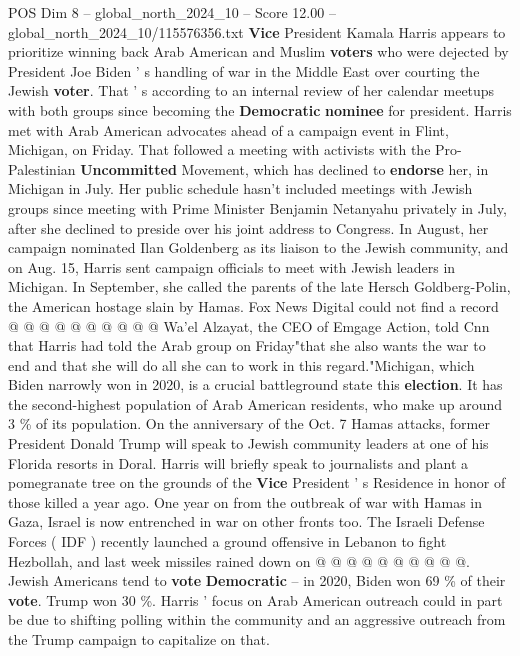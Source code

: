 \begin{textsample}{POS Dim 8 – global\_north\_2024\_10 – Score 12.00 – global\_north\_2024\_10/115576356.txt}  \label{ex:f8_pos_162}
\textbf{Vice} President Kamala Harris appears to prioritize winning back Arab American and Muslim \textbf{voters} who were dejected by President Joe Biden ' s handling of war in the Middle East over courting the Jewish \textbf{voter}.
That ' s according to an internal review of her calendar meetups with both groups since becoming the \textbf{Democratic} \textbf{nominee} for president.
Harris met with Arab American advocates ahead of a campaign event in Flint, Michigan, on Friday.
That followed a meeting with activists with the Pro-Palestinian \textbf{Uncommitted} Movement, which has declined to \textbf{endorse} her, in Michigan in July.
Her public schedule hasn't included meetings with Jewish groups since meeting with Prime Minister Benjamin Netanyahu privately in July, after she declined to preside over his joint address to Congress.
In August, her campaign nominated Ilan Goldenberg as its liaison to the Jewish community, and on Aug. 15, Harris sent campaign officials to meet with Jewish leaders in Michigan.
In September, she called the parents of the late Hersch Goldberg-Polin, the American hostage slain by Hamas.
Fox News Digital could not find a record @ @ @ @ @ @ @ @ @ @ Wa'el Alzayat, the CEO of Emgage Action, told Cnn that Harris had told the Arab group on Friday"that she also wants the war to end and that she will do all she can to work in this regard."Michigan, which Biden narrowly won in 2020, is a crucial battleground state this \textbf{election}.
It has the second-highest population of Arab American residents, who make up around 3 \% of its population.
On the anniversary of the Oct. 7 Hamas attacks, former President Donald Trump will speak to Jewish community leaders at one of his Florida resorts in Doral.
Harris will briefly speak to journalists and plant a pomegranate tree on the grounds of the \textbf{Vice} President ' s Residence in honor of those killed a year ago.
One year on from the outbreak of war with Hamas in Gaza, Israel is now entrenched in war on other fronts too.
The Israeli Defense Forces ( IDF ) recently launched a ground offensive in Lebanon to fight Hezbollah, and last week missiles rained down on @ @ @ @ @ @ @ @ @ @.
Jewish Americans tend to \textbf{vote} \textbf{Democratic} -- in 2020, Biden won 69 \% of their \textbf{vote}.
Trump won 30 \%.
Harris ' focus on Arab American outreach could in part be due to shifting polling within the community and an aggressive outreach from the Trump campaign to capitalize on that.

\end{textsample}
